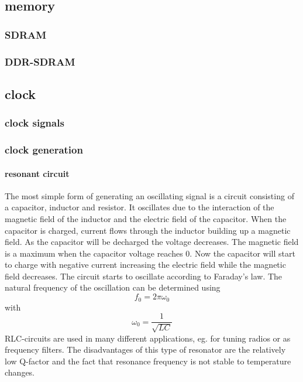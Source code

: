 \subsection{memory}
\subsubsection{SDRAM}
\subsubsection{DDR-SDRAM}
\subsection{clock}

\subsubsection{clock signals}
\subsubsection{clock generation}
\paragraph{resonant circuit\\}
The most simple form of generating an oscillating signal is a circuit consisting of a capacitor, inductor and resistor. It oscillates due to the interaction of the magnetic field of the inductor and the electric field of the capacitor. When the capacitor is charged, current flows through the inductor building up a magnetic field. As the capacitor will be decharged the voltage decreases. The magnetic field is a maximum when the capacitor voltage reaches 0. Now the capacitor will start to charge with negative current increasing the electric field while the magnetic field decreases. The circuit starts to oscillate according to Faraday's law. The natural frequency of the oscillation can be determined using
\begin{equation}
f_0=2\pi\omega_0
\end{equation}
with
\begin{equation}
\omega_0=\frac{1}{\sqrt{LC}}
\end{equation}
RLC-circuits are used in many different applications, eg. for tuning radios or as frequency filters. The disadvantages of this type of resonator are the relatively low Q-factor and the fact that resonance frequency is not stable to temperature changes.
